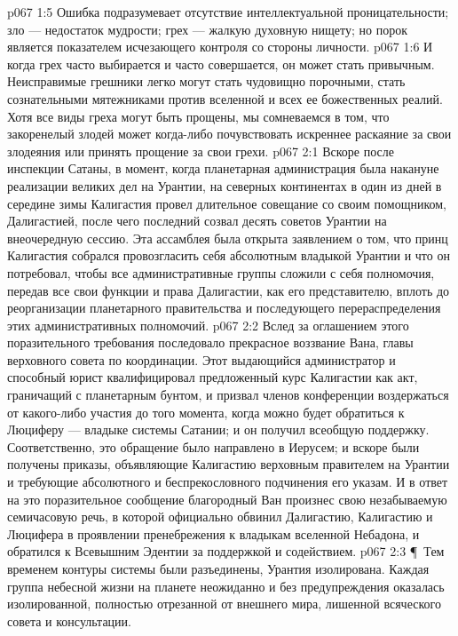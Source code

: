 \vs p067 1:5 Ошибка подразумевает отсутствие интеллектуальной проницательности; зло --- недостаток мудрости; грех --- жалкую духовную нищету; но порок является показателем исчезающего контроля со стороны личности.
\vs p067 1:6 И когда грех часто выбирается и часто совершается, он может стать привычным. Неисправимые грешники легко могут стать чудовищно порочными, стать сознательными мятежниками против вселенной и всех ее божественных реалий. Хотя все виды греха могут быть прощены, мы сомневаемся в том, что закоренелый злодей может когда\hyp{}либо почувствовать искреннее раскаяние за свои злодеяния или принять прощение за свои грехи.
\vs p067 2:1 Вскоре после инспекции Сатаны, в момент, когда планетарная администрация была накануне реализации великих дел на Урантии, на северных континентах в один из дней в середине зимы Калигастия провел длительное совещание со своим помощником, Далигастией, после чего последний созвал десять советов Урантии на внеочередную сессию. Эта ассамблея была открыта заявлением о том, что принц Калигастия собрался провозгласить себя абсолютным владыкой Урантии и что он потребовал, чтобы все административные группы сложили с себя полномочия, передав все свои функции и права Далигастии, как его представителю, вплоть до реорганизации планетарного правительства и последующего перераспределения этих административных полномочий.
\vs p067 2:2 Вслед за оглашением этого поразительного требования последовало прекрасное воззвание Вана, главы верховного совета по координации. Этот выдающийся администратор и способный юрист квалифицировал предложенный курс Калигастии как акт, граничащий с планетарным бунтом, и призвал членов конференции воздержаться от какого\hyp{}либо участия до того момента, когда можно будет обратиться к Люциферу --- владыке системы Сатании; и он получил всеобщую поддержку. Соответственно, это обращение было направлено в Иерусем; и вскоре были получены приказы, объявляющие Калигастию верховным правителем на Урантии и требующие абсолютного и беспрекословного подчинения его указам. И в ответ на это поразительное сообщение благородный Ван произнес свою незабываемую семичасовую речь, в которой официально обвинил Далигастию, Калигастию и Люцифера в проявлении пренебрежения к владыкам вселенной Небадона, и обратился к Всевышним Эдентии за поддержкой и содействием.
\vs p067 2:3 \P\ Тем временем контуры системы были разъединены, Урантия изолирована. Каждая группа небесной жизни на планете неожиданно и без предупреждения оказалась изолированной, полностью отрезанной от внешнего мира, лишенной всяческого совета и консультации.
